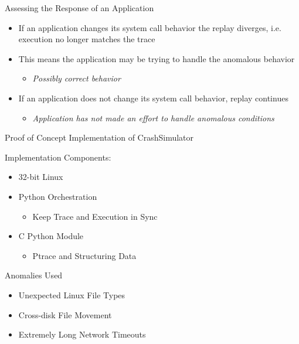 \documentclass[pdf]{beamer}
\begin{document}
\begin{frame}{Assessing the Response of an Application}
  \begin{itemize}
  \item{If an application changes its system call behavior the replay diverges,
      i.e. execution no longer matches the trace}
  \item{This means the application may be trying to handle the anomalous behavior}
    \begin{itemize}
    \item{\textit{Possibly correct behavior}}
    \end{itemize}
  \item{If an application does not change its system call behavior, replay
      continues}
    \begin{itemize}
    \item{\textit{Application has not made an effort to handle anomalous conditions}}
    \end{itemize}
  \end{itemize}
\end{frame}


\begin{frame}{Proof of Concept Implementation of CrashSimulator}

  Implementation Components:

  \begin{itemize}
  \item{32-bit Linux}
  \item{Python Orchestration}
    \begin{itemize}
    \item{Keep Trace and Execution in Sync}
    \end{itemize}
  \item{C Python Module}
    \begin{itemize}
    \item{Ptrace and Structuring Data}
    \end{itemize}
  \end{itemize}
\end{frame}


\begin{frame}{Anomalies Used}
  \begin{itemize}
  \item{Unexpected Linux File Types}
  \item{Cross-disk File Movement}
  \item{Extremely Long Network Timeouts}
  \end{itemize}
\end{frame}
\end{document}
